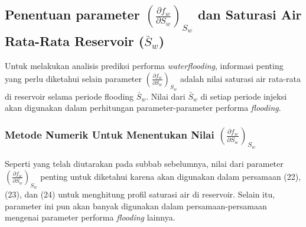 \documentclass[
]{book}
\begin{document}
\hypertarget{penentuan-parameter-left-fracpartial-f_wpartial-s_w-right_s_w-dan-saturasi-air-rata-rata-reservoir-bar-s_w}{%
\subsection{\texorpdfstring{Penentuan parameter \(\left( \frac{\partial f_w}{\partial S_w} \right)_{S_w}\) dan Saturasi Air Rata-Rata Reservoir (\(\bar S_w\))}{Penentuan parameter \textbackslash left( \textbackslash frac\{\textbackslash partial f\_w\}\{\textbackslash partial S\_w\} \textbackslash right)\_\{S\_w\} dan Saturasi Air Rata-Rata Reservoir (\textbackslash bar S\_w)}}\label{penentuan-parameter-left-fracpartial-f_wpartial-s_w-right_s_w-dan-saturasi-air-rata-rata-reservoir-bar-s_w}}

Untuk melakukan analisis prediksi performa \emph{waterflooding}, informasi penting yang perlu diketahui selain parameter \(\left( \frac{\partial f_w}{\partial S_w} \right)_{S_w}\) adalah nilai saturasi air rata-rata di reservoir selama periode flooding \(\bar S_w\). Nilai dari \(\bar S_w\) di setiap periode injeksi akan digunakan dalam perhitungan parameter-parameter performa \emph{flooding}.

\hypertarget{metode-numerik-untuk-menentukan-nilai-left-fracpartial-f_wpartial-s_w-right_s_w}{%
\subsubsection{\texorpdfstring{Metode Numerik Untuk Menentukan Nilai \(\left( \frac{\partial f_w}{\partial S_w} \right)_{S_w}\)}{Metode Numerik Untuk Menentukan Nilai \textbackslash left( \textbackslash frac\{\textbackslash partial f\_w\}\{\textbackslash partial S\_w\} \textbackslash right)\_\{S\_w\}}}\label{metode-numerik-untuk-menentukan-nilai-left-fracpartial-f_wpartial-s_w-right_s_w}}

Seperti yang telah diutarakan pada subbab sebelumnya, nilai dari parameter \(\left( \frac{\partial f_w}{\partial S_w} \right)_{S_w}\) penting untuk diketahui karena akan digunakan dalam persamaan (22), (23), dan (24) untuk menghitung profil saturasi air di reservoir. Selain itu, parameter ini pun akan banyak digunakan dalam persamaan-persamaan mengenai parameter performa \emph{flooding} lainnya.
\end{document}
